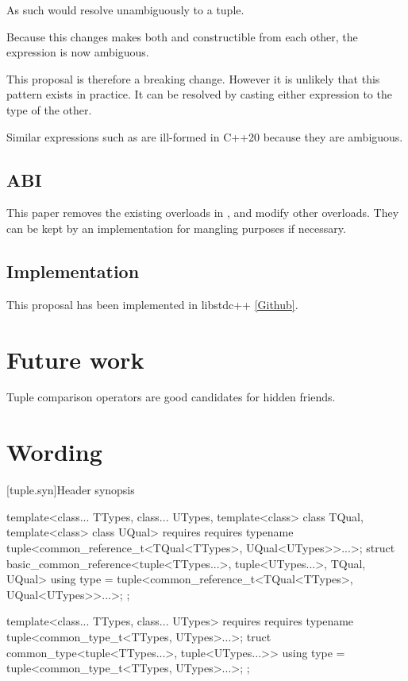 \documentclass{wg21}
\begin{document}
As such  would resolve unambiguously to a tuple.

Because this changes makes both  and  constructible from each other,
the expression is now ambiguous.

This proposal is therefore a breaking change.
However it is unlikely that this pattern exists in practice.
It can be resolved by casting either expression to the type of the other.

Similar expressions such as  are ill-formed in C++20 because they are ambiguous.

\subsection{ABI}

This paper removes the existing  overloads in , and modify other overloads.
They can be kept by an implementation for mangling purposes if necessary.

\subsection{Implementation}

This proposal has been implemented in libstdc++ \href{https://github.com/cor3ntin/gcc/tree/tuple_pair2}{[Github]}.

\section{Future work}

Tuple comparison operators are good candidates for hidden friends.

\section{Wording}


[tuple.syn]{Header  synopsis}


\begin{removedblock}
\begin{codeblock}
template<class... TTypes, class... UTypes, template<class> class TQual, template<class> class UQual>
requires requires { typename tuple<common_reference_t<TQual<TTypes>, UQual<UTypes>>...>; }
struct basic_common_reference<tuple<TTypes...>, tuple<UTypes...>, TQual, UQual> {
    using type = tuple<common_reference_t<TQual<TTypes>, UQual<UTypes>>...>;
};

template<class... TTypes, class... UTypes>
requires requires { typename tuple<common_type_t<TTypes, UTypes>...>; }
truct common_type<tuple<TTypes...>, tuple<UTypes...>> {
    using type = tuple<common_type_t<TTypes, UTypes>...>;
};
\end{codeblock}
\end{removedblock}
\end{document}
